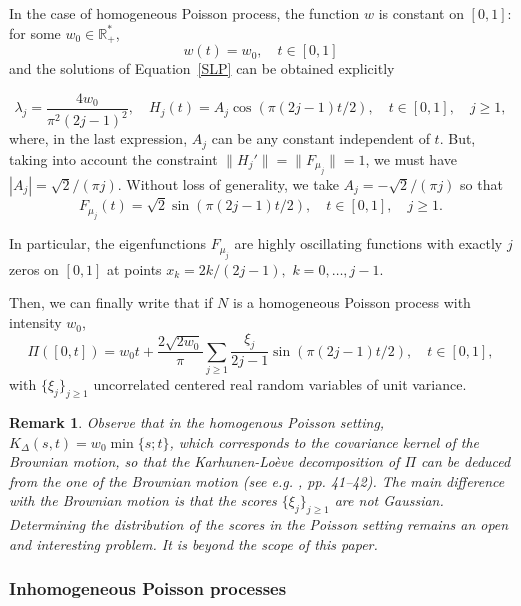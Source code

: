 \documentclass[aos]{imsart}
\theoremstyle{plain}
\newtheorem{remark}[theorem]{Remark}
\theoremstyle{remark}
\newcommand{\R}{\mathbb{R}}
\newcommand{\1}{1}
\begin{document}
In the case of homogeneous Poisson process, the function $w$ is constant on $[0,1]$: for some $w_0\in\R_+^*$,
\[
w(t)=w_0,\quad t\in [0,1]
\]
and the solutions of Equation~\eqref{SLP} can be obtained explicitly 

\[
\lambda_j=\frac{4w_0}{\pi^2(2j-1)^2},\quad H_j(t)=A_j\cos(\pi(2j-1)t/2), \quad t\in[0,1],\quad j\geq 1,\]
where, in the last expression, $A_j$ can be any constant independent of $t$. But, taking into account the constraint $\|H_j'\|=\|F_{\mu_j}\|=1$, we must have $|A_j|=\sqrt{2}/(\pi j)$. Without loss of generality, we take $A_j=-\sqrt{2}/(\pi j)$ so that
\begin{equation}\label{sin-Fj}
F_{\mu_j}(t)= \sqrt{2}\sin(\pi(2j-1)t/2),\quad t\in [0,1] ,\quad j\geq 1. 
\end{equation}


In particular, the eigenfunctions $F_{\mu_j}$ are highly oscillating functions with exactly $j$ zeros on $[0,1]$ at points $x_k=2k/(2j-1),$ $k=0,\ldots,j-1$.

\bigskip
Then, we can finally write that if $N$ is a homogeneous Poisson process with intensity $w_0$,
\[
\Pi([0,t]) = w_0t +\frac{2\sqrt{2w_0}}{\pi}\sum_{j\geq 1}\frac{\xi_j}{2j-1}\sin(\pi(2j-1)t/2),\quad t\in [0,1],
\]
with $\{\xi_j\}_{j\geq 1}$ uncorrelated centered real random variables of unit variance.
\begin{remark}
Observe that in the homogenous Poisson setting, $K_\Delta(s,t)=w_0\min\{s;t\}$, which corresponds to the covariance kernel of the Brownian motion, so that 
 the Karhunen-Lo\`eve decomposition of $\Pi$ can be deduced from the one of the Brownian motion (see e.g. \cite{ash_topics_1975}, pp. 41--42). The main difference with the Brownian motion is that the scores $\{\xi_j\}_{j\geq 1}$ are not Gaussian. Determining the distribution of the scores in the Poisson setting remains an open and interesting problem. It is beyond the scope of this paper.
\end{remark}


\subsubsection{Inhomogeneous Poisson processes}
\label{subsubsec:inhPP}
\end{document}
